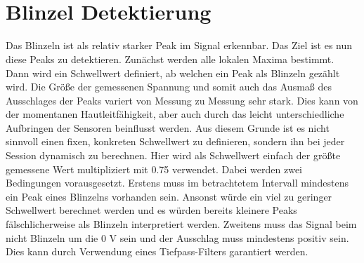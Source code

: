 \documentclass[11pt]{article}
\begin{document}
    \begin{center}
    \end{center}
    { \hspace*{\fill} \\}
    
    \begin{center}
    \end{center}
    { \hspace*{\fill} \\}
    
    \section{Blinzel Detektierung}\label{blinzel-detektierung}

Das Blinzeln ist als relativ starker Peak im Signal erkennbar. Das Ziel
ist es nun diese Peaks zu detektieren. Zunächst werden alle lokalen
Maxima bestimmt. Dann wird ein Schwellwert definiert, ab welchen ein
Peak als Blinzeln gezählt wird. Die Größe der gemessenen Spannung und
somit auch das Ausmaß des Ausschlages der Peaks variert von Messung zu
Messung sehr stark. Dies kann von der momentanen Hautleitfähigkeit, aber
auch durch das leicht unterschiedliche Aufbringen der Sensoren
beinflusst werden. Aus diesem Grunde ist es nicht sinnvoll einen fixen,
konkreten Schwellwert zu definieren, sondern ihn bei jeder Session
dynamisch zu berechnen. Hier wird als Schwellwert einfach der größte
gemessene Wert multipliziert mit 0.75 verwendet. Dabei werden zwei
Bedingungen vorausgesetzt. Erstens muss im betrachtetem Intervall
mindestens ein Peak eines Blinzelns vorhanden sein. Ansonst würde ein
viel zu geringer Schwellwert berechnet werden und es würden bereits
kleinere Peaks fälschlicherweise als Blinzeln interpretiert werden.
Zweitens muss das Signal beim nicht Blinzeln um die 0 V sein und der
Ausschlag muss mindestens positiv sein. Dies kann durch Verwendung eines
Tiefpass-Filters garantiert werden.
\end{document}
